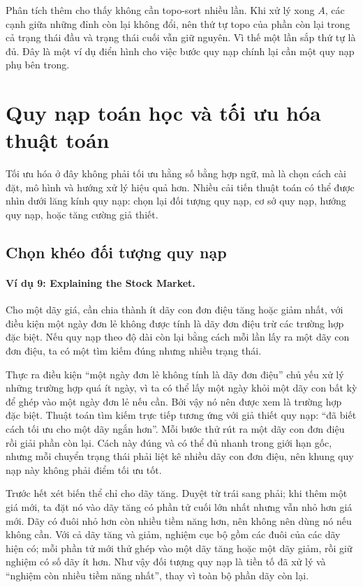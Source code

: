 \documentclass[11pt]{article}
\begin{document}
Phân tích thêm cho thấy không cần topo-sort nhiều lần. Khi xử lý xong \(A\),
các cạnh giữa những đỉnh còn lại không đổi, nên thứ tự topo của phần còn lại
trong cả trạng thái đầu và trạng thái cuối vẫn giữ nguyên. Vì thế một lần sắp
thứ tự là đủ. Đây là một ví dụ điển hình cho việc bước quy nạp chính lại cần
một quy nạp phụ bên trong.

\section{Quy nạp toán học và tối ưu hóa thuật toán}

Tối ưu hóa ở đây không phải tối ưu hằng số bằng hợp ngữ, mà là chọn cách cài
đặt, mô hình và hướng xử lý hiệu quả hơn. Nhiều cải tiến thuật toán có thể
được nhìn dưới lăng kính quy nạp: chọn lại đối tượng quy nạp, cơ sở quy nạp,
hướng quy nạp, hoặc tăng cường giả thiết.

\subsection{Chọn khéo đối tượng quy nạp}

\paragraph{Ví dụ 9: Explaining the Stock Market.}
Cho một dãy giá, cần chia thành ít dãy con đơn điệu tăng hoặc giảm nhất, với
điều kiện một ngày đơn lẻ không được tính là dãy đơn điệu trừ các trường hợp
đặc biệt. Nếu quy nạp theo độ dài còn lại bằng cách mỗi lần lấy ra một dãy
con đơn điệu, ta có một tìm kiếm đúng nhưng nhiều trạng thái.

Thực ra điều kiện ``một ngày đơn lẻ không tính là dãy đơn điệu'' chủ yếu xử lý
những trường hợp quá ít ngày, vì ta có thể lấy một ngày khỏi một dãy con bất
kỳ để ghép vào một ngày đơn lẻ nếu cần. Bởi vậy nó nên được xem là trường hợp
đặc biệt. Thuật toán tìm kiếm trực tiếp tương ứng với giả thiết quy nạp:
``đã biết cách tối ưu cho một dãy ngắn hơn''. Mỗi bước thử rút ra một dãy con
đơn điệu rồi giải phần còn lại. Cách này đúng và có thể đủ nhanh trong giới
hạn gốc, nhưng mỗi chuyển trạng thái phải liệt kê nhiều dãy con đơn điệu, nên
khung quy nạp này không phải điểm tối ưu tốt.

Trước hết xét biến thể chỉ cho dãy tăng. Duyệt từ trái sang phải; khi thêm
một giá mới, ta đặt nó vào dãy tăng có phần tử cuối lớn nhất nhưng vẫn nhỏ
hơn giá mới. Dãy có đuôi nhỏ hơn còn nhiều tiềm năng hơn, nên không nên dùng
nó nếu không cần. Với cả dãy tăng và giảm, nghiệm cục bộ gồm các đuôi của
các dãy hiện có; mỗi phần tử mới thử ghép vào một dãy tăng hoặc một dãy giảm,
rồi giữ nghiệm có số dãy ít hơn. Như vậy đối tượng quy nạp là tiền tố đã xử
lý và ``nghiệm còn nhiều tiềm năng nhất'', thay vì toàn bộ phần dãy còn lại.
\end{document}
